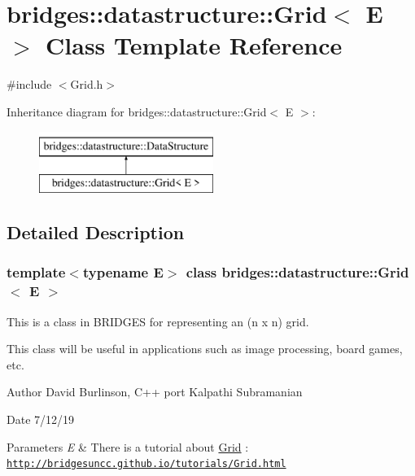 \hypertarget{classbridges_1_1datastructure_1_1_grid}{}\section{bridges\+:\+:datastructure\+:\+:Grid$<$ E $>$ Class Template Reference}
\label{classbridges_1_1datastructure_1_1_grid}


{\ttfamily \#include $<$Grid.\+h$>$}

Inheritance diagram for bridges\+:\+:datastructure\+:\+:Grid$<$ E $>$\+:\begin{figure}[H]
\begin{center}
\leavevmode
\includegraphics[height=2.000000cm]{classbridges_1_1datastructure_1_1_grid}
\end{center}
\end{figure}


\subsection{Detailed Description}
\subsubsection*{template$<$typename E$>$\newline
class bridges\+::datastructure\+::\+Grid$<$ E $>$}

This is a class in B\+R\+I\+D\+G\+ES for representing an (n x n) grid. 

This class will be useful in applications such as image processing, board games, etc.

\begin{DoxyAuthor}{Author}
David Burlinson, C++ port Kalpathi Subramanian 
\end{DoxyAuthor}
\begin{DoxyDate}{Date}
7/12/19
\end{DoxyDate}

\begin{DoxyParams}{Parameters}
{\em E} & There is a tutorial about \hyperlink{classbridges_1_1datastructure_1_1_grid}{Grid} \+: \href{http://bridgesuncc.github.io/tutorials/Grid.html}{\tt http\+://bridgesuncc.\+github.\+io/tutorials/\+Grid.\+html} \\
\hline
\end{DoxyParams}
